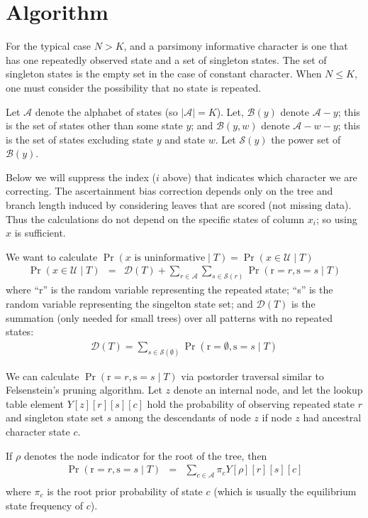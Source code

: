 \documentclass[11pt]{article}
\begin{document}
\section*{Algorithm}
For the typical case $N > K$, and a parsimony informative character 
is one that has one repeatedly observed state and a set of singleton states. 
The set of singleton states is the empty set in the case of 
	constant character.
When $N \leq K$, one must consider the possibility that no state is repeated.

Let $\mathcal{A}$ denote the alphabet of states (so $|\mathcal{A}| = K$).
Let, $\mathcal{B}(y)$ denote $\mathcal{A} - y$; this is the set of 
	states other than some state $y$; and
	$\mathcal{B}(y, w)$ denote $\mathcal{A} - w - y$; this is the set of states excluding state $y$ and state $w$.
Let $\mathcal{S}(y)$ the power set of $\mathcal{B}(y)$.

Below we will suppress the index ($i$ above) that indicates which character we are correcting.
The ascertainment bias correction depends only on the tree and branch length induced by considering leaves that are scored (not missing data).
Thus the calculations do not depend on the specific states of column
$x_i$; so using $x$ is sufficient.

We want to calculate $\Pr(x\mbox{ is uninformative}\mid T) = \Pr(x\in \mathcal{U}\mid T)$
\begin{eqnarray*}
\Pr(x\in \mathcal{U}\mid T) & = & \mathcal{D}(T) + \sum_{r\in \mathcal{A}}\sum_{s\in\mathcal{S}(r)}\Pr(\mbox{r}=r, \mbox{s}=s\mid T)
\end{eqnarray*}
where ``r'' is the random variable representing the repeated state; ``s'' is the random variable representing the singelton state set; and 
$\mathcal{D}(T)$ is the summation (only needed for small trees) over
all patterns with no repeated states:
\begin{eqnarray*}
\mathcal{D}(T) = \sum_{s\in\mathcal{S}(\emptyset)}\Pr(\mbox{r}=\emptyset, \mbox{s}=s\mid T)
\end{eqnarray*}


We can calculate $\Pr(\mbox{r}=r, \mbox{s}=s\mid T)$ via postorder traversal similar to Felsenstein's pruning algorithm.
Let $z$ denote an internal node, and let the lookup table element
$Y[z][r][s][c]$ hold
the probability of observing repeated state $r$ and singleton state set $s$ among the descendants of node $z$ if node $z$ had ancestral
character state $c$.

If $\rho$ denotes the node indicator for the root of the tree, then
\begin{eqnarray*}
\Pr(\mbox{r}=r, \mbox{s}=s\mid T) & = & \sum_{c\in\mathcal{A}} \pi_c Y[\rho][r][s][c]\\
\end{eqnarray*}
where $\pi_c$ is the root prior probability of state $c$ (which is
usually the equilibrium state frequency of $c$).
\end{document}
